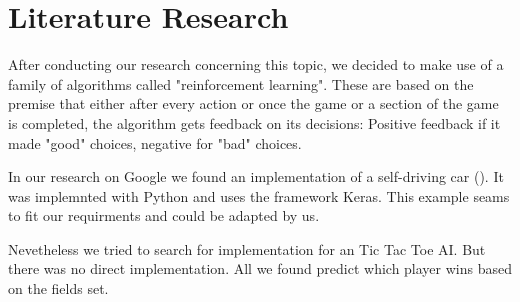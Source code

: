 \section{Literature Research}
After conducting our research concerning this topic, we decided to make use of a family of algorithms called "reinforcement learning". These are based on the premise that either after every action or once the game or a section of the game is completed, the algorithm gets feedback on its decisions: Positive feedback if it made "good" choices, negative for "bad" choices.
 
In our research on Google we found an implementation of a self-driving car (\cite{Harvey17}). It was implemnted with Python and uses the framework Keras. This example seams to fit our requirments and could be adapted by us.

Nevetheless we tried to search for implementation for an Tic Tac Toe AI. But there was no direct implementation. All we found predict which player wins based on the fields set.  

